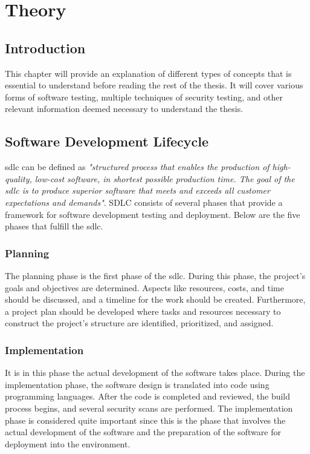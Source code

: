 \chapter{Theory}
\label{chap:Theory}

\section{Introduction}
This chapter will provide an explanation of different types of concepts that is essential to understand before reading the rest of the thesis. It will cover various forms of software testing, multiple techniques of security testing, and other relevant information deemed necessary to understand the thesis.


\section{Software Development Lifecycle}
\acrlong{sdlc} can be defined as \textit{"structured process that enables the production of high-quality, low-cost software, in shortest possible production time. The goal of the \acrshort{sdlc} is to produce superior software that meets and exceeds all customer expectations and demands"}\cite{sdlc1}.  SDLC consists of several phases that provide a framework for software development testing and deployment. Below are the five phases that fulfill the \acrshort{sdlc}. 

\subsection{Planning} 
The planning phase is the first phase of the \acrshort{sdlc}. During this phase, the project's goals and objectives are determined. Aspects like resources, costs, and time should be discussed, and a timeline for the work should be created.  Furthermore, a project plan should be developed where tasks and resources necessary to construct the project's structure are identified, prioritized, and assigned. \cite{planningphase}
 
\subsection{Implementation}
It is in this phase the actual development of the software takes place. During the implementation phase, the software design is translated into code using programming languages. After the code is completed and reviewed, the build process begins, and several security scans are performed.
The implementation phase is considered quite important since this is the phase that involves the actual development of the software and the preparation of the software for deployment into the environment.  \cite{ImplementationSDLC}
 
